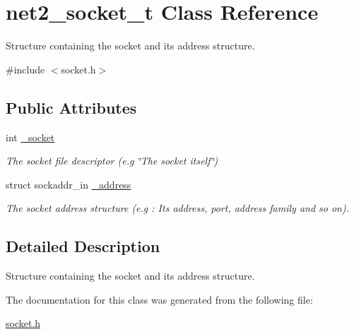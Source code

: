 \hypertarget{structnet2__socket__t}{\section{net2\-\_\-socket\-\_\-t Class Reference}
\label{structnet2__socket__t}
}


Structure containing the socket and its address structure.  




{\ttfamily \#include $<$socket.\-h$>$}

\subsection*{Public Attributes}
\begin{DoxyCompactItemize}
\item 
\hypertarget{structnet2__socket__t_a605421383ca1720f2f46dbc19b4fd101}{int \hyperlink{structnet2__socket__t_a605421383ca1720f2f46dbc19b4fd101}{\-\_\-socket}}\label{structnet2__socket__t_a605421383ca1720f2f46dbc19b4fd101}

\begin{DoxyCompactList}\small\item\em The socket file descriptor (e.\-g \char`\"{}\-The socket itself\char`\"{}) \end{DoxyCompactList}\item 
\hypertarget{structnet2__socket__t_a6527b2540e35955db1187ddee8b75877}{struct sockaddr\-\_\-in \hyperlink{structnet2__socket__t_a6527b2540e35955db1187ddee8b75877}{\-\_\-address}}\label{structnet2__socket__t_a6527b2540e35955db1187ddee8b75877}

\begin{DoxyCompactList}\small\item\em The socket address structure (e.\-g \-: Its address, port, address family and so on). \end{DoxyCompactList}\end{DoxyCompactItemize}


\subsection{Detailed Description}
Structure containing the socket and its address structure. 

The documentation for this class was generated from the following file\-:\begin{DoxyCompactItemize}
\item 
\hyperlink{socket_8h}{socket.\-h}\end{DoxyCompactItemize}
